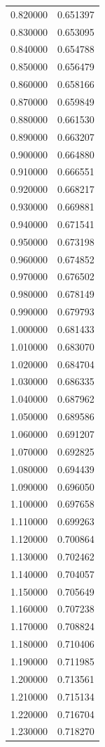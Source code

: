 \begin{tabular}{rr}
0.820000 & 0.651397 \\
0.830000 & 0.653095 \\
0.840000 & 0.654788 \\
0.850000 & 0.656479 \\
0.860000 & 0.658166 \\
0.870000 & 0.659849 \\
0.880000 & 0.661530 \\
0.890000 & 0.663207 \\
0.900000 & 0.664880 \\
0.910000 & 0.666551 \\
0.920000 & 0.668217 \\
0.930000 & 0.669881 \\
0.940000 & 0.671541 \\
0.950000 & 0.673198 \\
0.960000 & 0.674852 \\
0.970000 & 0.676502 \\
0.980000 & 0.678149 \\
0.990000 & 0.679793 \\
1.000000 & 0.681433 \\
1.010000 & 0.683070 \\
1.020000 & 0.684704 \\
1.030000 & 0.686335 \\
1.040000 & 0.687962 \\
1.050000 & 0.689586 \\
1.060000 & 0.691207 \\
1.070000 & 0.692825 \\
1.080000 & 0.694439 \\
1.090000 & 0.696050 \\
1.100000 & 0.697658 \\
1.110000 & 0.699263 \\
1.120000 & 0.700864 \\
1.130000 & 0.702462 \\
1.140000 & 0.704057 \\
1.150000 & 0.705649 \\
1.160000 & 0.707238 \\
1.170000 & 0.708824 \\
1.180000 & 0.710406 \\
1.190000 & 0.711985 \\
1.200000 & 0.713561 \\
1.210000 & 0.715134 \\
1.220000 & 0.716704 \\
1.230000 & 0.718270 \\

\end{tabular}
